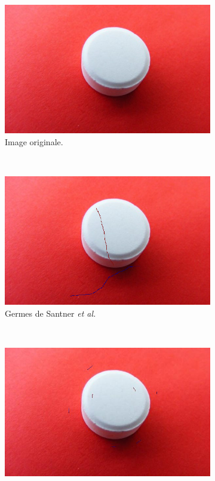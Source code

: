 \begin{figure}[htb]
 \centering
 \begin{subfigure}[t]{0.4\textwidth}	
\includegraphics[width=\textwidth]{images/evaluation/SeedsSantner/image_0217_9060}
\caption{Image originale.}
 \end{subfigure}
 \\
 \begin{subfigure}[t]{0.4\textwidth}
\includegraphics[width=\textwidth]{images/evaluation/SeedsSantner/image_0217_9060_seeds_santner}
\caption{Germes de Santner \textit{et al.}}
 \end{subfigure}
 ~
 \begin{subfigure}[t]{0.4\textwidth}
\includegraphics[width=\textwidth]{images/evaluation/SeedsSantner/image_0217_9060_seeds_saf}

\end{subfigure}
\end{figure}
